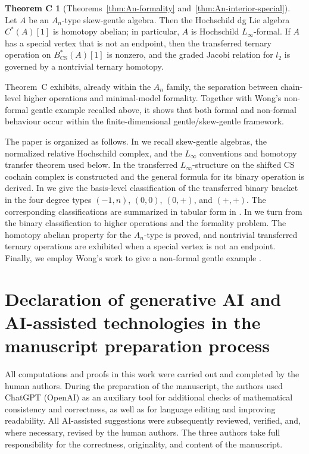 \documentclass[11pt,a4paper,reqno]{amsart}
\theoremstyle{plain}
\theoremstyle{definition}
\numberwithin{equation}{section}
\newtheorem*{maintheoremc}{Theorem C}
\begin{document}
	\begin{maintheoremc}[Theorems~\ref{thm:An-formality} and~\ref{thm:An-interior-special}]
		Let $A$ be an $A_n$-type skew-gentle algebra. Then the Hochschild dg Lie
		algebra $C^*(A)[1]$ is homotopy abelian; in particular, $A$ is Hochschild $L_\infty$-formal. If $A$ has a special vertex that is not an endpoint,
		then the transferred ternary operation on $B_{\mathrm{CS}}^*(A)[1]$ is
		nonzero, and the graded Jacobi relation for $l_2$ is governed by a
		nontrivial ternary homotopy.
	\end{maintheoremc}
	
	Theorem~C exhibits, already within the $A_n$ family, the separation between
	chain-level higher operations and minimal-model formality.  Together with
	Wong's non-formal gentle example recalled above, it shows that both formal and
	non-formal behaviour occur within the finite-dimensional gentle/skew-gentle
	framework.
	
	The paper is organized as follows. In  we recall
	skew-gentle algebras, the normalized relative Hochschild complex, and the
	$L_\infty$ conventions and homotopy transfer theorem used below. In
	 the transferred $L_\infty$-structure on
	the shifted CS cochain complex is constructed and the general formula for its binary
	operation is derived. In
	we give the basis-level classification of the transferred binary
	bracket in the four degree types $(-1,n)$, $(0,0)$, $(0,+)$, and $(+,+)$.  The
	corresponding classifications are summarized in tabular form in
	. In  we turn from the binary
	classification to higher operations and the formality problem.  The homotopy abelian property for the $A_n$-type is proved, and nontrivial
	transferred ternary operations are exhibited when a special vertex is not
	an endpoint. Finally, we employ Wong's work to give a non-formal gentle example \cite{Won17}.

	\section*{Declaration of generative AI and AI-assisted technologies in the manuscript preparation process}
	
	All computations and proofs in this work were carried out
	and completed by the human authors. During the preparation of the
	manuscript, the authors used ChatGPT (OpenAI) as an auxiliary tool for
	additional checks of mathematical consistency and correctness, as well as
	for language editing and improving readability. All AI-assisted suggestions
	were subsequently reviewed, verified, and, where necessary, revised by the
	human authors. The three authors take full responsibility for the
    correctness, originality, and content of the manuscript.
\end{document}
